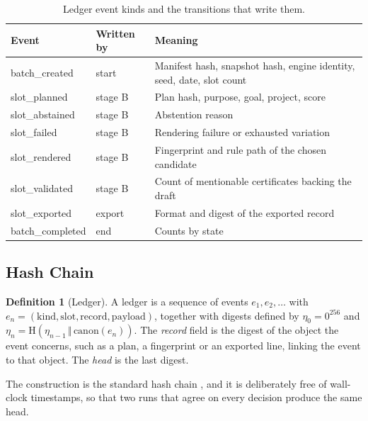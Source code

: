 \documentclass[11pt]{article}
\theoremstyle{definition}
\newtheorem{definition}[theorem]{Definition}
\theoremstyle{remark}
\newcommand{\Hash}{\mathrm{H}}
\newcommand{\canon}{\mathrm{canon}}
\begin{document}
\begin{table}[H]
\centering
\caption{Ledger event kinds and the transitions that write them.}\label{tab:events}
\small
\begin{tabular}{llp{6.6cm}}
\toprule
Event & Written by & Meaning\\
\midrule
batch\_created & start & Manifest hash, snapshot hash, engine identity, seed, date, slot count\\
slot\_planned & stage B & Plan hash, purpose, goal, project, score\\
slot\_abstained & stage B & Abstention reason\\
slot\_failed & stage B & Rendering failure or exhausted variation\\
slot\_rendered & stage B & Fingerprint and rule path of the chosen candidate\\
slot\_validated & stage B & Count of mentionable certificates backing the draft\\
slot\_exported & export & Format and digest of the exported record\\
batch\_completed & end & Counts by state\\
\bottomrule
\end{tabular}
\end{table}

\subsection{Hash Chain}

\begin{definition}[Ledger]\label{def:ledger}
A ledger is a sequence of events $e_1,e_2,\dots$ with $e_n=(\mathrm{kind},\mathrm{slot},\mathrm{record},\mathrm{payload})$, together with digests defined by $\eta_0=0^{256}$ and $\eta_n=\Hash(\eta_{n-1}\,\Vert\,\canon(e_n))$. The \emph{record} field is the digest of the object the event concerns, such as a plan, a fingerprint or an exported line, linking the event to that object. The \emph{head} is the last digest.
\end{definition}

The construction is the standard hash chain \cite{merkle1990}, and it is deliberately free of wall-clock timestamps, so that two runs that agree on every decision produce the same head.
\end{document}
